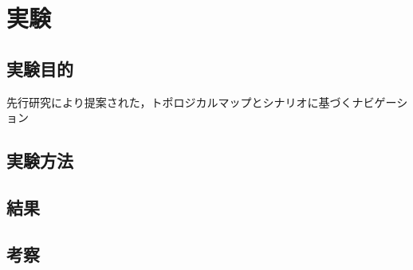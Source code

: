\documentclass[../main]{subfiles}
\begin{document}
\setcounter{secnumdepth}{2}
    \chapter{実験}
    \section{実験目的}
    先行研究により提案された，トポロジカルマップとシナリオに基づくナビゲーション
    \section{実験方法}
    \section{結果}
    \section{考察}
\end{document}
